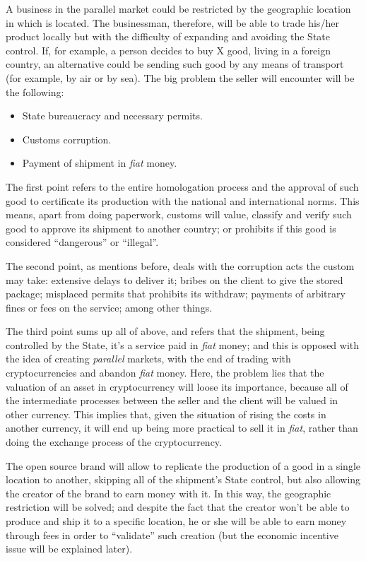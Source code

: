 \documentclass[12pt,a4paper]{article}
\begin{document}
A business in the parallel market could be restricted by the geographic location in which is located. The businessman, therefore, will be able to trade his/her product locally but with the difficulty of expanding and avoiding the State control. If, for example, a person decides to buy X good, living in a foreign country, an alternative could be sending such good by any means of transport (for example, by air or by sea). The big problem the seller will encounter will be the following:

\begin{itemize}
\item State bureaucracy and necessary permits.
\item Customs corruption.
\item Payment of shipment in \textit{fiat} money.
\end{itemize}

The first point refers to the entire homologation process and the approval of such good to certificate its production with the national and international norms. This means, apart from doing paperwork, customs will value, classify and verify such good to approve its shipment to another country; or prohibits if this good is considered “dangerous” or “illegal”.

The second point, as mentions before, deals with the corruption acts the custom may take: extensive delays to deliver it; bribes on the client to give the stored package; misplaced permits that prohibits its withdraw; payments of arbitrary fines or fees on the service; among other things.

The third point sums up all of above, and refers that the shipment, being controlled by the State, it's a service paid in \textit{fiat} money; and this is opposed with the idea of creating \textit{parallel} markets, with the end of trading with cryptocurrencies and abandon \textit{fiat} money. Here, the problem lies that the valuation of an asset in cryptocurrency will loose its importance, because all of the intermediate processes between the seller and the client will be valued in other currency. This implies that, given the situation of rising the costs in another currency, it will end up being more practical to sell it in \textit{fiat}, rather than doing the exchange process of the cryptocurrency.

The open source brand will allow to replicate the production of a good in a single location to another, skipping all of the shipment's State control, but also allowing the creator of the brand to earn money with it. In this way, the geographic restriction will be solved; and despite the fact that the creator won't be able to produce and ship it to a specific location, he or she will be able to earn money through fees in order to “validate” such creation (but the economic incentive issue will be explained later).
\end{document}
